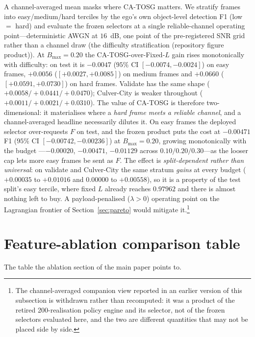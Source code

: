 \documentclass[journal]{IEEEtran}
\newcommand{\method}{CA-TOSG}
\begin{document}
A channel-averaged mean masks where \method{} matters. We stratify frames into
easy/medium/hard terciles by the ego's own object-level detection F1 (low $=$ hard) and
evaluate the frozen selectors at a single reliable-channel operating point---deterministic
AWGN at $16$~dB, one point of the pre-registered SNR grid rather than a channel
draw (the difficulty stratification (repository figure product)). At $B_{\max}=0.20$ the CA-TOSG-over-Fixed-$L$ gain rises
monotonically with difficulty: on test it is $-0.0047$ ($95\%$ CI $[-0.0074,-0.0024]$) on
easy frames, $+0.0056$ ($[+0.0027,+0.0085]$) on medium frames and
$\mathbf{+0.0660}$ ($[+0.0591,+0.0730]$) on hard frames. Validate has the same shape
($+0.0058 / +0.0441 / +0.0470$); Culver-City is weaker throughout
($+0.0011 / +0.0021 / +0.0310$). The value of \method{} is therefore two-dimensional:
it materialises where a \emph{hard frame meets a reliable channel}, and a
channel-averaged headline necessarily dilutes it. On easy frames the deployed selector
over-requests $F$ on test, and the frozen product puts the cost at $-0.00471$ F1
($95\%$ CI $[-0.00742,-0.00236]$) at $B_{\max}=0.20$, growing monotonically with the budget
---$-0.00020$, $-0.00471$, $-0.01129$ across $0.10/0.20/0.30$---as the looser cap lets more easy
frames be sent as $F$. The effect is \emph{split-dependent rather than universal}: on validate and
Culver-City the same stratum \emph{gains} at every budget ($+0.00035$ to $+0.01016$ and $0.00000$
to $+0.00558$), so it is a property of the test split's easy tercile, where fixed $L$ already
reaches $0.97962$ and there is almost nothing left to buy. A payload-penalised
($\lambda>0$) operating point on the Lagrangian frontier of Section~\ref{sec:pareto}
would mitigate it.\footnote{The channel-averaged companion view reported in an earlier
version of this subsection is withdrawn rather than recomputed: it was a product of the
retired 200-realisation policy engine and its selector, not of the frozen selectors
evaluated here, and the two are different quantities that may not be placed side by side.}




\section{Feature-ablation comparison table}\label{sec:ablation_table}
The table the ablation section of the main paper points to.
\end{document}
